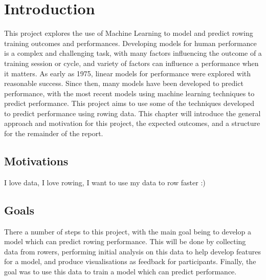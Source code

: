 \chapter{\label{chap:intro}Introduction}
This project explores the use of Machine Learning to model and predict rowing training outcomes and performances. Developing models for human performance is a complex and challenging task, with many factors influencing the outcome of a training session or cycle, and variety of factors can influence a performance when it matters. As early as 1975, linear models for performance were explored with reasonable success. Since then, many models have been developed to predict performance, with the most recent models using machine learning techniques to predict performance. This project aims to use some of the techniques developed to predict performance using rowing data. This chapter will introduce the general approach and motivation for this project, the expected outcomes, and a structure for the remainder of the report.

\section{Motivations}
I love data, I love rowing, I want to use my data to row faster :)

\section{Goals}
There a number of steps to this project, with the main goal being to develop a model which can predict rowing performance. This will be done by collecting data from rowers, performing initial analysis on this data to help develop features for a model, and produce visualisations as feedback for participants. Finally, the goal was to use this data to train a model which can predict performance. 

